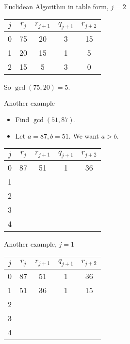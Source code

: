 \documentclass[handout]{beamer}
\begin{document}
\begin{frame}{Euclidean Algorithm in table form, $j=2$}

\begin{tabular}{|c|c|c|c|c|}\hline
$j$   &  $r_{j}$    & $r_{j+1}$ & $q_{j+1}$ & $r_{j+2}$ \\ \hline\hline
0     &  75         &  20       &    3      &   15      \\ \hline
1     &  20         &  15       &    1      &   5       \\ \hline
2     &  15         &  5        &    3      &   0       \\ \hline
\end{tabular}

\vspace{0.5in}

So $\gcd(75, 20) = 5$.

\end{frame}

\begin{frame}{Another example}

\begin{itemize}
\item Find $\gcd(51, 87)$.
\item Let $a=87, b=51$. We want $a>b$.
\end{itemize}

\pause

\begin{tabular}{|c|c|c|c|c|}\hline
$j$   &  $r_{j}$    & $r_{j+1}$ & $q_{j+1}$ & $r_{j+2}$ \\ \hline\hline
0     &  87         &  51       &    1      &   36      \\ \hline
1     &             &           &           &           \\ \hline
2     &             &           &           &           \\ \hline
3     &             &           &           &           \\ \hline
4     &             &           &           &           \\ \hline
\end{tabular}

\end{frame}

\begin{frame}{Another example, $j=1$}

\begin{tabular}{|c|c|c|c|c|}\hline
$j$   &  $r_{j}$    & $r_{j+1}$ & $q_{j+1}$ & $r_{j+2}$ \\ \hline\hline
0     &  87         &  51       &    1      &   36      \\ \hline
1     &  51         &  36       &    1      &   15      \\ \hline
2     &             &           &           &           \\ \hline
3     &             &           &           &           \\ \hline
4     &             &           &           &           \\ \hline
\end{tabular}

\end{frame}
\end{document}
